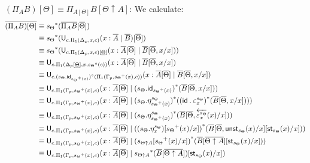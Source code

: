 \documentclass[10pt]{article}
\theoremstyle{definition}
\newcommand{\rewrite}[2]{\overleftarrow{#1}(#2)}
\newcommand\U[3]{\ensuremath{\mathsf{U}_{#1}(#2 \mid #3)}}
\newcommand\St[2]{\ensuremath{{#1}^*(#2)}}
\newcommand\StI[2]{\ensuremath{\mathsf{st}_{#1}(#2)}}
\newcommand\UnSt[2]{\ensuremath{\mathsf{unst}_{#1}(#2)}}
\newcommand\TrPlus[2]{\ensuremath{{#1}^+(#2)}}
\newcommand\TrCirc[2]{\ensuremath{{#1}^\circ(#2)}}
\newcommand{\id}{\mathsf{id}}
\newcommand\bdot[0]{\mathbin{.}}
\begin{document}
\begin{enumerate}[style = multiline, labelwidth = 80pt]
\item[{$(\Pi_A B)[\Theta] \equiv \Pi_{A[\Theta]} B[\Theta \uparrow A] $}:] We calculate:
\begin{align*}
\upstairs{(\Pi_A B)[\Theta]} 
&\equiv \St{s_{\Theta}}{\upstairs{\Pi_A B}[\upstairs{\Theta}]} \\
&\equiv \St{s_{\Theta}}{\U{c.\Pi_1(\asdep{\Delta},x,c)}{x : \upstairs{A}}{\upstairs{B}}[\upstairs{\Theta}]} \\
&\equiv \St{s_{\Theta}}{\U{c.\Pi_1(\asdep{\Delta},x,c)[\downstairs{\Theta}]}{x : \upstairs{A}[\upstairs{\Theta}]}{\upstairs{B}[\upstairs{\Theta}, x/x]}} \\
&\equiv \U{c.\Pi_1(\asdep{\Delta}[\downstairs{\Theta}],x,\TrCirc{s_{\Theta}}{c})}{x : \upstairs{A}[\upstairs{\Theta}]}{\upstairs{B}[\upstairs{\Theta},x/x]} \\
&\equiv \U{c.\TrCirc{(s_{\Theta} . \id_{\TrPlus{s_\Theta}{x}})}{\Pi_1(\asdep{\Gamma},\TrPlus{s_\Theta}{x},c)}}{x : \upstairs{A}[\upstairs{\Theta}]}{\upstairs{B}[\upstairs{\Theta}, x/x]} \\
&\equiv \U{c.\Pi_1(\asdep{\Gamma},\TrPlus{s_\Theta}{x},c)}{x : \upstairs{A}[\upstairs{\Theta}]}{\St{(s_{\Theta} . \id_{\TrPlus{s_\Theta}{x}})}{\upstairs{B}[\upstairs{\Theta}, x/x]}} \\
&\equiv \U{c.\Pi_1(\asdep{\Gamma},\TrPlus{s_\Theta}{x},c)}{x : \upstairs{A}[\upstairs{\Theta}]}{\St{(s_{\Theta} . \eta^{s_\Theta}_{\TrPlus{s_\Theta}{x}})}{\St{(\id \bdot \varepsilon^{s_\Theta}_x)}{\upstairs{B}[\upstairs{\Theta}, x/x]}}} \\
&\equiv \U{c.\Pi_1(\asdep{\Gamma},\TrPlus{s_\Theta}{x},c)}{x : \upstairs{A}[\upstairs{\Theta}]}{\St{(s_{\Theta} . \eta^{s_\Theta}_{\TrPlus{s_\Theta}{x}})}{\upstairs{B}[\upstairs{\Theta}, \rewrite{\varepsilon^{s_\Theta}_x}{x}/x]}} \\
&\equiv \U{c.\Pi_1(\asdep{\Gamma},\TrPlus{s_\Theta}{x},c)}{x : \upstairs{A}[\upstairs{\Theta}]}{\St{((s_{\Theta} . \eta^{s_\Theta}_x)[\TrPlus{s_\Theta}{x}/x])}{\upstairs{B}[\upstairs{\Theta}, \UnSt{s_\Theta}{x}/x][\StI{s_\Theta}{x}/x]}} \\
&\equiv \U{c.\Pi_1(\asdep{\Gamma},\TrPlus{s_\Theta}{x},c)}{x : \upstairs{A}[\upstairs{\Theta}]}{\St{(s_{\Theta \uparrow A}[\TrPlus{s_\Theta}{x}/x])}{\upstairs{B}[\upstairs{\Theta \uparrow A}][\StI{s_\Theta}{x}/x]}} \\
&\equiv \U{c.\Pi_1(\asdep{\Gamma},\TrPlus{s_\Theta}{x},c)}{x : \upstairs{A}[\upstairs{\Theta}]}{\St{s_{\Theta \uparrow A}}{\upstairs{B}[\upstairs{\Theta \uparrow A}]}[\StI{s_\Theta}{x}/x]} \\

\end{align*}
\end{enumerate}
\end{document}
